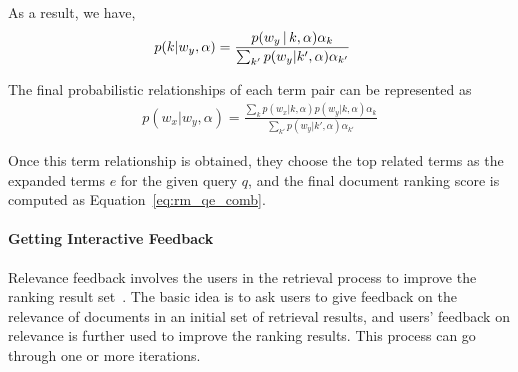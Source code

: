 As a result, we have,
\begin{align}
p(k|w_y, \alpha) %
&= \frac{p(w_y \g k,\alpha) \alpha_k}{\sum_{k'} p(w_y|k',\alpha) \alpha_{k'}} \notag
\end{align}

The final probabilistic relationships of each term pair  can be represented as
\begin{align}
p(w_x|w_y, \alpha) = \frac{\sum_k p(w_x|k, \alpha) p(w_y|k,\alpha) \alpha_k }{\sum_{k'} p(w_y|k',\alpha) \alpha_{k'}}
\end{align}

Once this term relationship is obtained, they choose the top related
terms as the expanded terms $e$ for the given query $q$, and the final
document ranking score is computed as Equation~\ref{eq:rm_qe_comb}.

\paragraph{Getting Interactive Feedback}

Relevance feedback involves the users in the retrieval process to improve the ranking result set~\citep{Rocchio-1971}. The basic idea is to ask users to give feedback on the relevance of documents in an initial set of retrieval results, and users' feedback on relevance is further used to improve the ranking results. This process can go through one or more iterations.

